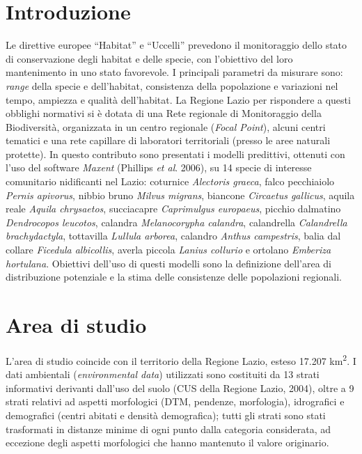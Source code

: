 \section*{Introduzione}

Le direttive europee {\textquotedblleft}Habitat{\textquotedblright} e
{\textquotedblleft}Uccelli{\textquotedblright} prevedono il
monitoraggio dello stato di conservazione degli habitat e delle specie,
con l{\textquoteright}obiettivo del loro mantenimento in uno stato
favorevole. I principali parametri da misurare sono: \textit{range
}della specie e dell{\textquoteright}habitat, consistenza della
popolazione e variazioni nel tempo, ampiezza e qualit\`a
dell{\textquoteright}habitat. La Regione Lazio per rispondere a questi
obblighi normativi si \`e dotata di una Rete regionale di Monitoraggio
della Biodiversit\`a, organizzata in un centro regionale (\textit{Focal
Point}), alcuni centri tematici e una rete capillare di laboratori
territoriali (presso le aree naturali protette). In questo contributo
sono presentati i modelli predittivi, ottenuti con
l{\textquoteright}uso del software \textit{Maxent} (Phillips \textit{et
al}. 2006), su 14 specie di interesse comunitario nidificanti nel
Lazio: coturnice \textit{Alectoris graeca}, falco pecchiaiolo
\textit{Pernis apivorus}, nibbio bruno \textit{Milvus migrans},
biancone \textit{Circaetus gallicus}, aquila reale \textit{Aquila
chrysaetos}, succiacapre \textit{Caprimulgus europaeus}, picchio
dalmatino \textit{Dendrocopos leucotos}, calandra \textit{Melanocorypha
calandra}, calandrella \textit{Calandrella brachydactyla}, tottavilla
\textit{Lullula arborea}, calandro \textit{Anthus campestris}, balia
dal collare \textit{Ficedula albicollis}, averla piccola \textit{Lanius
collurio} e ortolano \textit{Emberiza hortulana}. Obiettivi
dell{\textquoteright}uso di questi modelli sono la definizione
dell{\textquoteright}area di distribuzione potenziale e la stima delle
consistenze delle popolazioni regionali.

\section*{Area di studio}

L{\textquoteright}area di studio coincide con il territorio della
Regione Lazio, esteso 17.207 km\textsuperscript{2}. I dati ambientali
(\textit{environmental data}) utilizzati sono costituiti da 13 strati
informativi derivanti dall{\textquoteright}uso del suolo (CUS della
Regione Lazio, 2004), oltre a 9 strati relativi ad aspetti morfologici
(DTM, pendenze, morfologia), idrografici e demografici (centri abitati
e densit\`a demografica); tutti gli strati sono stati trasformati in
distanze minime di ogni punto dalla categoria considerata, ad eccezione
degli aspetti morfologici che hanno mantenuto il valore originario. 


